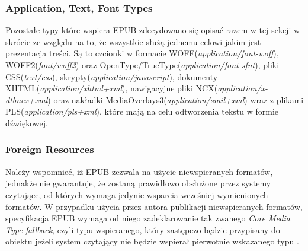 \subsubsection*{Application, Text, Font Types}

Pozostałe typy które wspiera EPUB zdecydowano się opisać razem w tej sekcji w skrócie ze względu na to, że wszystkie służą jednemu celowi jakim jest prezentacja treści. Są to czcionki w formacie WOFF(\textit{application/font-woff}), WOFF2(\textit{font/woff2}) oraz OpenType/TrueType(\textit{application/font-sfnt}), pliki CSS(\textit{text/css}), skrypty(\textit{application/javascript}), dokumenty XHTML(\textit{application/xhtml+xml}), nawigacyjne pliki NCX(\textit{application/x-dtbncx+xml}) oraz nakładki MediaOverlays3(\textit{application/smil+xml}) wraz z plikami PLS(\textit{application/pls+xml}), które mają na celu odtworzenia tekstu w formie dźwiękowej\cite{EPUBCoreMediaTypes}.

\subsubsection*{Foreign Resources}

Należy wspomnieć, iż EPUB zezwala na użycie niewspieranych formatów, jednakże nie gwarantuje, że zostaną prawidłowo obsłużone przez systemy czytające, od których wymaga jedynie wsparcia wcześniej wymienionych formatów. W przypadku użycia przez autora publikacji niewspieranych formatów, specyfikacja EPUB wymaga od niego zadeklarowanie tak zwanego \textit{Core Media Type fallback}, czyli typu wspieranego, który zastępczo będzie przypisany do obiektu jeżeli system czytający nie będzie wspierał pierwotnie wskazanego typu \cite{EPUBSpecification}.
